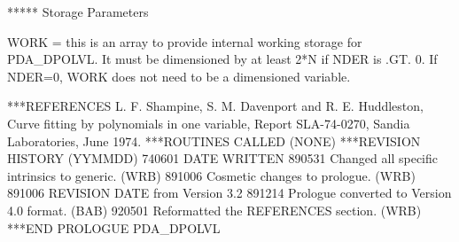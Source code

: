 \documentclass[11pt,twoside,nolof]{starlink}
\begin{document}
\begin{terminalv}
     ***** Storage Parameters

     WORK  = this is an array to provide internal working storage for
             PDA_DPOLVL.  It must be dimensioned by at least 2*N if NDER is
             .GT. 0.  If NDER=0, WORK does not need to be a dimensioned
             variable.

***REFERENCES  L. F. Shampine, S. M. Davenport and R. E. Huddleston,
                 Curve fitting by polynomials in one variable, Report
                 SLA-74-0270, Sandia Laboratories, June 1974.
***ROUTINES CALLED  (NONE)
***REVISION HISTORY  (YYMMDD)
   740601  DATE WRITTEN
   890531  Changed all specific intrinsics to generic.  (WRB)
   891006  Cosmetic changes to prologue.  (WRB)
   891006  REVISION DATE from Version 3.2
   891214  Prologue converted to Version 4.0 format.  (BAB)
   920501  Reformatted the REFERENCES section.  (WRB)
***END PROLOGUE  PDA_DPOLVL
\end{terminalv}
\end{document}
